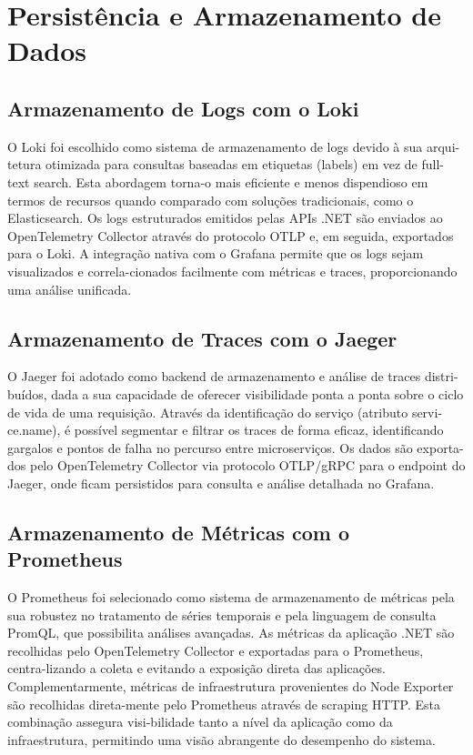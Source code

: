 \section{Persistência e Armazenamento de Dados }

\subsection{Armazenamento de Logs com o Loki}

O Loki foi escolhido como sistema de armazenamento de logs devido à sua arqui-tetura otimizada para consultas baseadas em etiquetas (labels) em vez de full-text search. Esta abordagem torna-o mais eficiente e menos dispendioso em termos de recursos quando comparado com soluções tradicionais, como o Elasticsearch. Os logs estruturados emitidos pelas APIs .NET são enviados ao OpenTelemetry Collector através do protocolo OTLP e, em seguida, exportados para o Loki. A integração nativa com o Grafana permite que os logs sejam visualizados e correla-cionados facilmente com métricas e traces, proporcionando uma análise unificada.

\subsection{Armazenamento de Traces com o Jaeger}

O Jaeger foi adotado como backend de armazenamento e análise de traces distri-buídos, dada a sua capacidade de oferecer visibilidade ponta a ponta sobre o ciclo de vida de uma requisição. Através da identificação do serviço (atributo servi-ce.name), é possível segmentar e filtrar os traces de forma eficaz, identificando gargalos e pontos de falha no percurso entre microserviços. Os dados são exporta-dos pelo OpenTelemetry Collector via protocolo OTLP/gRPC para o endpoint do Jaeger, onde ficam persistidos para consulta e análise detalhada no Grafana.

\subsection{Armazenamento de Métricas com o Prometheus}

O Prometheus foi selecionado como sistema de armazenamento de métricas pela sua robustez no tratamento de séries temporais e pela linguagem de consulta PromQL, que possibilita análises avançadas. As métricas da aplicação .NET são recolhidas pelo OpenTelemetry Collector e exportadas para o Prometheus, centra-lizando a coleta e evitando a exposição direta das aplicações. Complementarmente, métricas de infraestrutura provenientes do Node Exporter são recolhidas direta-mente pelo Prometheus através de scraping HTTP. Esta combinação assegura visi-bilidade tanto a nível da aplicação como da infraestrutura, permitindo uma visão abrangente do desempenho do sistema.
